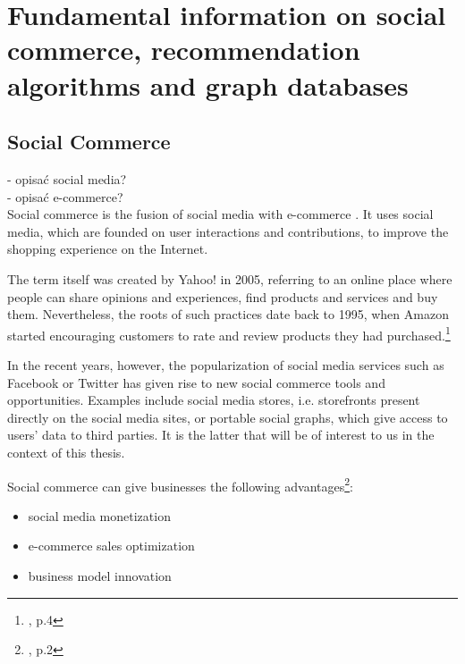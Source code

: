 \documentclass[12pt]{report}
\begin{document}




\chapter[Fundamental information on social...]{Fundamental information on social commerce, recommendation algorithms and graph databases} \label{fundamental_info}

\section{Social Commerce}

- opisać social media?\\
- opisać e-commerce?\\

Social commerce is the fusion of social media with e-commerce \cite{social_commerce_syzygy}. It uses social media, which are founded on user interactions and contributions, to improve the shopping experience on the Internet.

The term itself was created by Yahoo! in 2005, referring to an online place where people can share opinions and experiences, find products and services and buy them. Nevertheless, the roots of such practices date back to 1995, when Amazon started encouraging customers to rate and review products they had purchased.\footnote{\cite{social_commerce_syzygy}, p.4}

In the recent years, however, the popularization of social media services such as Facebook or Twitter has given rise to new social commerce tools and opportunities. Examples include social media stores, i.e. storefronts present directly on the social media sites, or portable social graphs, which give access to users' data to third parties. It is the latter that will be of interest to us in the context of this thesis.


Social commerce can give businesses the following advantages\footnote{\cite{social_commerce_syzygy}, p.2}:
\begin{itemize}
\item social media monetization
\item e-commerce sales optimization
\item business model innovation
\end{itemize}
\end{document}
